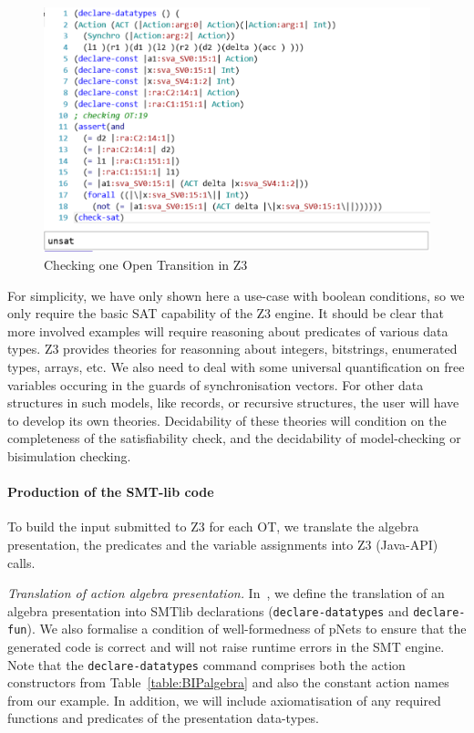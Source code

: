 \documentclass[smallcondensed]{svjour3}
\begin{document}
\begin{figure}[t]
    \centerline{\includegraphics[width=0.8\linewidth]{ActaXFIG/rise4fun1}}
  \caption{Checking one Open Transition in Z3}  \label{schema:smt-lib}
\end{figure}

For simplicity, we have only shown here a use-case with boolean conditions, so we only require the basic SAT capability of the Z3
engine. It should be clear that more involved examples will require
reasoning about predicates of various data types. Z3 provides theories for reasonning
about integers, bitstrings, enumerated types, arrays, etc.
We also need to deal with some universal quantification on free
variables occuring in the guards of synchronisation vectors.
For other data structures  in such models, like records, or
recursive structures, the user will have to develop its own theories.
Decidability of these theories will condition on the completeness of the
satisfiability check, and the decidability of model-checking or
bisimulation checking.





\paragraph{Production of the SMT-lib code}
  To build the input submitted to Z3 for each OT,
we translate the algebra presentation, the predicates and the
variable assignments into Z3 (Java-API) calls.

\emph{Translation of action algebra presentation.}
In~\cite{AVOCS18}, we  define the translation of an algebra presentation into
SMTlib declarations (\texttt{declare-datatypes} and
\texttt{declare-fun}). We also formalise a condition of well-formedness of pNets to ensure that the generated code is correct
and will not raise runtime errors in the SMT engine. Note that the
\texttt{declare-datatypes} command comprises both the action
constructors from Table~\ref{table:BIPalgebra} and also the constant action
names from our example.
In addition, we will include axiomatisation of any required functions
and predicates of the presentation data-types.
\end{document}
